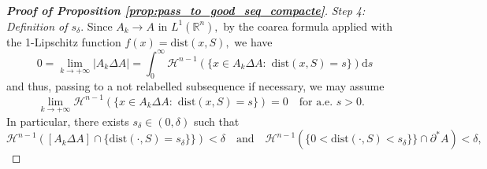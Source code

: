 \documentclass[reqno]{amsart}
\numberwithin{equation}{section}
\theoremstyle{plain}
\theoremstyle{definition}
\newcommand{\R}{\mathbb{R}}
\newcommand{\cH}{\mathcal{H}}
\newcommand{\p}{\partial}
\renewcommand{\d}{\mathrm{d}}
\newcommand{\dist}{\mathrm{dist}}
\begin{document}
\begin{proof}[\textbf{Proof of Proposition \ref{prop:pass_to_good_seq_compacte}}]
{\it Step 4: Definition of $s_\delta.$} Since $A_k\to A$ in $L^1(\R^n),$ by the coarea formula applied with the 1-Lipschitz function $f(x)=\dist(x,S),$ we have
$$
0=\lim\limits_{k\to+\infty} |A_k\Delta A| = \int_0^\infty \cH^{n-1}(\{x\in A_k\Delta A:\,\,\dist(x,S) = s\}) \d s
$$
and thus, passing to a not relabelled subsequence if necessary, we may assume
\begin{equation*}
\lim\limits_{k\to+\infty} \cH^{n-1}(\{x\in A_k\Delta A:\,\,\dist(x,S) = s\}) = 0 \quad \text{for a.e.\  $s>0.$ }
\end{equation*}
%
In particular, there exists $s_\delta\in (0,\delta)$ such that
\begin{equation*}
\cH^{n-1}([A_k\Delta A] \cap \{\dist(\cdot, S) = s_\delta\}\}) < \delta \quad \text{and} \quad 
\cH^{n-1}(\{0 < \dist(\cdot, S) < s_\delta\}\} \cap  \p^*A) < \delta,
\end{equation*}
% 





\end{proof}
\end{document}
